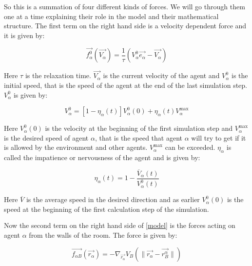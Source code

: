 So this is a summation of four different kinds of forces. We will go through 
them one at a time explaining their role in the model and their mathematical 
structure. The first term on the right hand side is a velocity dependent force 
and it is given by:

\begin{equation}
	\vec{f^{0}_{\alpha}}\left( \vec{V_{\alpha}} \right) =
    \frac{1}{\tau}
    \left( V_{\alpha}^{0} \vec{e_{\alpha}} - \vec{V_{\alpha}} \right)
\end{equation}

Here $\tau$ is the relaxation time. $\vec{V_{\alpha}}$ is the 
current velocity of the agent and $V_{\alpha}^{0}$ is the initial speed, that is 
the speed of the agent at the end of the last simulation step. $V_{\alpha}^{0}$ is given by:

\begin{equation}
    V_{\alpha}^{0} = \left[ 1 - \eta_{\alpha} \left( t \right) \right] 
    V_{\alpha}^{0} \left( 0 \right) +
    \eta_{\alpha} \left( t \right)V_{\alpha}^{\text{max}}
\end{equation}

Here $V_{\alpha}^{0} \left( 0 \right)$ is the velocity at the beginning of the 
first simulation step and $V_{\alpha}^{\text{max}}$ is the desired speed of agent
$\alpha$, that is the speed that agent $\alpha$ will try to get if it is allowed by the 
environment and other agents. $V_{\alpha}^{\text{max}}$ can be exceeded. $\eta_{\alpha}$ 
is called the impatience or nervousness of the agent and is given by:

\begin{equation}
	\eta_{\alpha} \left( t \right) =
    1 - \frac{\overline{V}_{\alpha} \left( t \right)}
             {V_{\alpha}^{0} \left( t \right)}
\end{equation}

Here $\overline{V}$ is the average speed in the desired direction and as 
earlier $V_{\alpha}^{0} \left( 0 \right)$ is the speed at the beginning of the 
first calculation step of the simulation.

Now the second term on the right hand side of \eqref{model} is the forces acting on agent 
$\alpha$ from the walls of the room. The force is given by:

\begin{equation}
    \vec{f_{\alpha B}} \left( \vec{r_{\alpha}} \right) =
    - \nabla_{\vec{r_{\alpha}}} V_{B}
    \left( \| \vec{r_{\alpha}} - \vec{r_{B}^{\alpha}} \| \right)
\end{equation}

